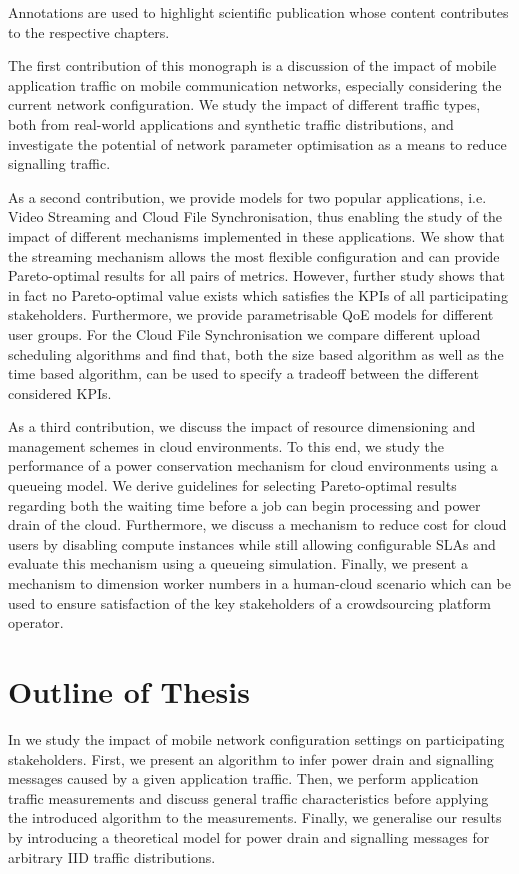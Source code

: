 Annotations are used to highlight scientific publication whose content contributes to the respective chapters.

The first contribution of this monograph is a discussion of the impact of mobile application traffic on mobile communication networks, especially considering the current network configuration.
We study the impact of different traffic types, both from real-world applications and synthetic traffic distributions, and investigate the potential of network parameter optimisation as a means to reduce signalling traffic.

As a second contribution, we provide models for two popular applications, i.e. Video Streaming and Cloud File Synchronisation, thus enabling the study of the impact of different mechanisms implemented in these applications.
We show that the streaming mechanism allows the most flexible configuration and can provide Pareto-optimal results for all pairs of metrics.
However, further study shows that in fact no Pareto-optimal value exists which satisfies the \glspl{KPI} of all participating stakeholders.
Furthermore, we provide parametrisable \gls{QoE} models for different user groups.
For the Cloud File Synchronisation we compare different upload scheduling algorithms and find that, both the size based algorithm as well as the time based algorithm, can be used to specify a tradeoff between the different considered \glspl{KPI}.

As a third contribution, we discuss the impact of resource dimensioning and management schemes in cloud environments.
To this end, we study the performance of a power conservation mechanism for cloud environments using a queueing model.
We derive guidelines for selecting Pareto-optimal results regarding both the waiting time before a job can begin processing and power drain of the cloud.
Furthermore, we discuss a mechanism to reduce cost for cloud users by disabling compute instances while still allowing configurable \glspl{SLA} and evaluate this mechanism using a queueing simulation.
Finally, we present a mechanism to dimension worker numbers in a human-cloud scenario which can be used to ensure satisfaction of the key stakeholders of a crowdsourcing platform operator.

\section{Outline of Thesis}\label{sec:introduction:outline}

In  we study the impact of mobile network configuration settings on participating stakeholders.
First, we present an algorithm to infer power drain and signalling messages caused by a given application traffic.
Then, we perform application traffic measurements and discuss general traffic characteristics before applying the introduced algorithm to the measurements.
Finally, we generalise our results by introducing a theoretical model for power drain and signalling messages for arbitrary \gls{IID} traffic distributions.

